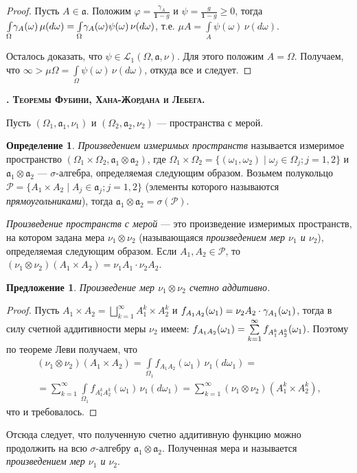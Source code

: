 \documentclass[12pt,titlepage]{article}
\newcounter{tema}
\renewcommand{\thetema}{\arabic{tema}}
\newcommand*{\tema}[1]{\vspace{10pt}
\begin{center}{\textbf{\refstepcounter{tema}
\textsc{\thetema. #1.}}}\vspace{7pt}
\end{center}}
\newtheorem{predl}{Предложение}[tema]
\theoremstyle{definition}
\newtheorem{defen}{Определение}[tema]
\newcommand*{\p}[1]{#1\nobreak\discretionary{}{\hbox{$\mathsurround=0pt #1$}}{}}
\begin{document}
\begin{proof}
Пусть $A\in\mathfrak{a}$. Положим
$\varphi=\frac{\gamma_A}{\mathbf{1}-g}$ и
$\psi=\frac{g}{\mathbf{1}-g}\geqslant 0$, тогда
$\int\limits_\Omega\!\gamma_A(\omega)\,\mu(d\omega)\p=\int\limits_\Omega\!\gamma_A(\omega)
\psi(\omega)\,\nu(d\omega)$, т.е. $\mu
A=\int\limits_A\!\psi(\omega)\,\nu(d\omega)$.

Осталось доказать, что
$\psi\in\mathcal{L}_1(\Omega,\mathfrak{a},\nu)$. Для этого положим
$A=\Omega$. Получаем, что
$\infty>\mu\Omega=\int\limits_\Omega\!\psi(\omega)\,\nu(d\omega)$,
откуда все и следует.
\end{proof}

\tema{Теоремы Фубини, Хана-Жордана и Лебега}

Пусть $(\Omega_1,\mathfrak{a}_1,\nu_1)$ и
$(\Omega_2,\mathfrak{a}_2,\nu_2)$ --- пространства с мерой.

\begin{defen}
\emph{Произведением измеримых пространств} называется измеримое
пространство $(\Omega_1\times\Omega_2,
\mathfrak{a}_1\otimes\mathfrak{a}_2)$, где $\Omega_1\times
\Omega_2=\{(\omega_1,\omega_2)\mid \omega_j\in\Omega_j;j=1,2\}$ и
$\mathfrak{a}_1\otimes\mathfrak{a}_2$ --- $\sigma$-алгебра,
определяемая следующим образом. Возьмем полукольцо
$\mathcal{P}=\{A_1\times A_2\mid A_j\in\mathfrak{a}_j;j=1,2\}$
(элементы которого называются \emph{прямоугольниками}), тогда
$\mathfrak{a}_1\otimes \mathfrak{a}_2=\sigma(\mathcal{P})$.

\emph{Произведение пространств с мерой} --- это произведение
измеримых пространств, на котором задана мера $\nu_1\otimes\nu_2$
(называющаяся \emph{произведением мер $\nu_1$ и $\nu_2$}),
определяемая следующим образом. Если $A_1,A_2\in\mathcal{P}$, то
$(\nu_1\otimes \nu_2)(A_1\times A_2)=\nu_1 A_1\cdot\nu_2 A_2$.

\begin{predl}
Произведение мер $\nu_1\otimes\nu_2$ счетно аддитивно.
\end{predl}

\begin{proof}
Пусть $A_1\times A_2=\bigsqcup\limits_{k=1}^\infty A_1^k\times
A_2^k$ и $f_{A_1A_2}(\omega_1)=\nu_2
A_2\p\cdot\gamma_{A_1}(\omega_1)$, тогда в силу счетной аддитивности
меры $\nu_2$ имеем: $f_{A_1A_2}(\omega_1)\p=\sum\limits_{k=1}^\infty
f_{A_1^kA_2^k}(\omega_1)$. Поэтому по теореме Леви получаем, что
\begin{multline*}
(\nu_1\otimes\nu_2)(A_1\times A_2)=\int\limits_{\Omega_1}\!f_{A_1
A_2}(\omega_1)\,\nu_1(d\omega_1)=\\
=\sum\limits_{k=1}^\infty\int\limits_{\Omega_1}
\!f_{A_1^kA_2^k}(\omega_1)\,\nu_1(d\omega_1)=\sum\limits_{k=1}^\infty
(\nu_1\otimes\nu_2)(A_1^k\times A_2^k),
\end{multline*}
что и требовалось.
\end{proof}

Отсюда следует, что полученную счетно аддитивную функцию можно
продолжить на всю $\sigma$-алгебру
$\mathfrak{a}_1\otimes\mathfrak{a}_2$. Полученная мера и называется
\emph{произведением мер $\nu_1$ и $\nu_2$}.
\end{defen}
\end{document}

